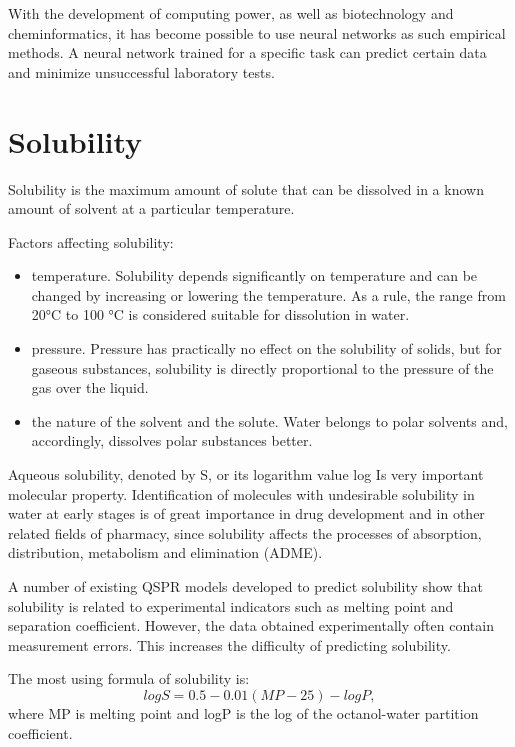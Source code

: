 \documentclass[a4paper,14pt]{article}
\begin{document}
With the development of computing power, as well as biotechnology and cheminformatics, it has become possible to use neural networks as such empirical methods. A neural network trained for a specific task can predict certain data and minimize unsuccessful laboratory tests.

\section{Solubility}\label{2}
Solubility is the maximum amount of solute that can be dissolved in a known amount of solvent at a particular temperature.

Factors affecting solubility:
\begin {itemize}
\item {temperature. Solubility depends significantly on temperature and can be changed by increasing or lowering the temperature. As a rule, the range from 20°C to 100 °C is considered suitable for dissolution in water.}

\item{pressure. Pressure has practically no effect on the solubility of solids, but for gaseous substances, solubility is directly proportional to the pressure of the gas over the liquid.}

\item{the nature of the solvent and the solute. Water belongs to polar solvents and, accordingly, dissolves polar substances better.}
\end {itemize}

Aqueous solubility, denoted by S, or its logarithm value log Is very important molecular property. Identification of
molecules with undesirable solubility in water at early stages is of great importance in drug development and in other related fields of pharmacy, since solubility affects the processes of absorption, distribution, metabolism and elimination (ADME).

A number of existing QSPR models developed to predict solubility show that solubility is related to experimental indicators such as melting point and separation coefficient.
However, the data obtained experimentally often contain measurement errors. This increases the difficulty of predicting solubility.

The most using formula of solubility is:
\begin {equation}
 logS =  0.5 - 0.01(MP - 25) - logP,
\end{equation}
where MP is melting point and logP is the log of the octanol-water partition coefficient.
\end{document}

